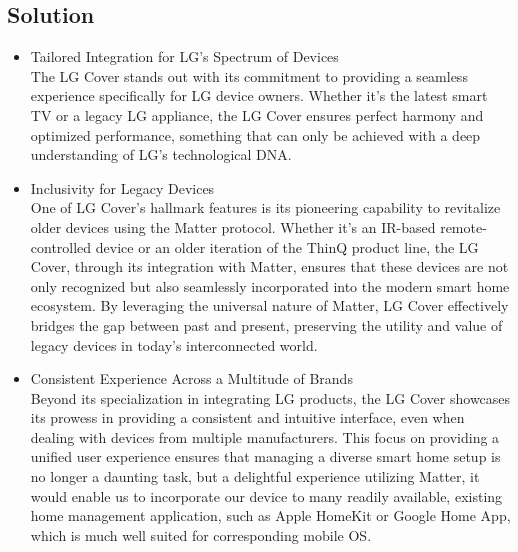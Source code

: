 \documentclass[conference]{IEEEtran}
\begin{document}
\subsection{\large{Solution}}
\begin{itemize}
\item Tailored Integration for LG's Spectrum of Devices\\
The LG Cover stands out with its commitment to providing a seamless experience specifically for LG device owners. Whether it's the latest smart TV or a legacy LG appliance, the LG Cover ensures perfect harmony and optimized performance, something that can only be achieved with a deep understanding of LG's technological DNA.\\
\item Inclusivity for Legacy Devices\\
One of LG Cover's hallmark features is its pioneering capability to revitalize older devices using the Matter protocol. Whether it's an IR-based remote-controlled device or an older iteration of the ThinQ product line, the LG Cover, through its integration with Matter, ensures that these devices are not only recognized but also seamlessly incorporated into the modern smart home ecosystem. By leveraging the universal nature of Matter, LG Cover effectively bridges the gap between past and present, preserving the utility and value of legacy devices in today's interconnected world.\\
\item Consistent Experience Across a Multitude of Brands\\
Beyond its specialization in integrating LG products, the LG Cover showcases its prowess in providing a consistent and intuitive interface, even when dealing with devices from multiple manufacturers. This focus on providing a unified user experience ensures that managing a diverse smart home setup is no longer a daunting task, but a delightful experience utilizing Matter, it would enable us to incorporate our device to many readily available, existing home management application, such as Apple HomeKit or Google Home App, which is much well suited for corresponding mobile OS.\\
\end{itemize}
\end{document}

